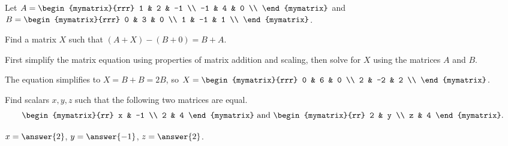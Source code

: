 \documentclass{ximera}
\begin{document}
\begin{problem}
  Let $A = \begin{mymatrix}{rrr}
    1 & 2 & -1 \\
    -1 & 4 & 0 \\
  \end{mymatrix}$ and
  $B = \begin{mymatrix}{rrr}
    0 & 3 & 0 \\
    1 & -1 & 1 \\
  \end{mymatrix}$.\par\noindent
  Find a matrix $X$ such that $(A+X)-(B+0) = B+A$. 
  
  \begin{hint}
    First simplify the matrix equation using properties of matrix addition and scaling, then solve for $X$ using the matrices $A$ and $B$.
  \end{hint}

  \begin{sol}
    The equation simplifies to $X=B+B=2B$, so $X = \begin{mymatrix}{rrr}
    0 & 6 & 0 \\
    2 & -2 & 2 \\
    \end{mymatrix}$.
  \end{sol}
\end{problem}

\begin{problem}
  Find scalars $x,y,z$ such that the following two matrices are equal.
  \begin{equation*}
    \begin{mymatrix}{rr}
      x & -1 \\
      2 & 4
    \end{mymatrix}
    \quad\mbox{and}\quad
    \begin{mymatrix}{rr}
      2 & y \\
      z & 4
    \end{mymatrix}.
  \end{equation*}
  \begin{sol}
    $x=\answer{2}$, $y=\answer{-1}$, $z=\answer{2}$.
  \end{sol}
\end{problem}
\end{document}
